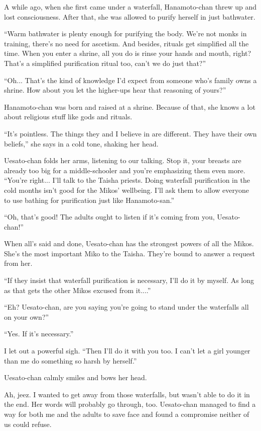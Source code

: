 A while ago, when she first came under a waterfall, Hanamoto-chan threw up and lost consciousness. After that, she was allowed to purify herself in just bathwater.

``Warm bathwater is plenty enough for purifying the body. We're not monks in training, there's no need for ascetism. And besides, rituals get simplified all the time. When you enter a shrine, all you do is rinse your hands and mouth, right? That's a simplified purification ritual too, can't we do just that?''

``Oh... That's the kind of knowledge I'd expect from someone who's family owns a shrine. How about you let the higher-ups hear that reasoning of yours?''

Hanamoto-chan was born and raised at a shrine. Because of that, she knows a lot about religious stuff like gods and rituals.

``It's pointless. The things they and I believe in are different. They have their own beliefs,'' she says in a cold tone, shaking her head.

Uesato-chan folds her arms, listening to our talking. Stop it, your breasts are already too big for a middle-schooler and you're emphasizing them even more.  ``You're right... I'll talk to the Taisha priests. Doing waterfall purification in the cold months isn't good for the Mikos' wellbeing. I'll ask them to allow everyone to use bathing for purification just like Hanamoto-san.''

``Oh, that's good! The adults ought to listen if it's coming from you, Uesato-chan!''

When all's said and done, Uesato-chan has the strongest powers of all the Mikos. She's the most important Miko to the Taisha. They're bound to answer a request from her.

``If they insist that waterfall purification is necessary, I'll do it by myself. As long as that gets the other Mikos excused from it....''

``Eh? Uesato-chan, are you saying you're going to stand under the waterfalls all on your own?''

``Yes. If it's necessary.''

I let out a powerful sigh.  ``Then I'll do it with you too. I can't let a girl younger than me do something so harsh by herself.''

Uesato-chan calmly smiles and bows her head.

Ah, jeez. I wanted to get away from those waterfalls, but wasn't able to do it in the end. Her words will probably go through, too. Uesato-chan managed to find a way for both me and the adults to save face and found a compromise neither of us could refuse.

